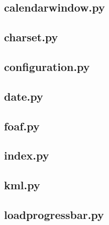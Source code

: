 \subsection*{calendarwindow.py}



\subsection*{charset.py}



\subsection*{configuration.py}



\subsection*{date.py}



\subsection*{foaf.py}



\subsection*{index.py}



\subsection*{kml.py}



\subsection*{loadprogressbar.py}



